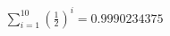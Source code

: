 \documentclass[preview]{standalone}
\begin{document}
\begin{align*}
\sum_{i=1}^{10} \left(\frac{1}{2}\right)^i = {0.9990234375}
\end{align*}
\end{document}
